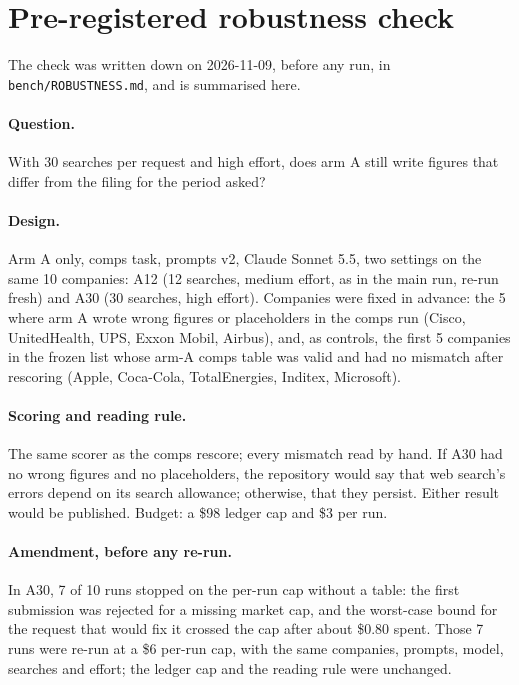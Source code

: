 \documentclass[10pt,a4paper]{article}
\begin{document}
\section{Pre-registered robustness check}
\label{app:prereg}

The check was written down on 2026-11-09, before any run, in \texttt{bench/ROBUSTNESS.md}, and is summarised here.

\paragraph{Question.} With 30 searches per request and high effort, does arm A still write figures that differ from
the filing for the period asked?

\paragraph{Design.} Arm A only, comps task, prompts v2, Claude Sonnet 5.5, two settings on the same 10 companies:
A12 (12 searches, medium effort, as in the main run, re-run fresh) and A30 (30 searches, high effort). Companies were
fixed in advance: the 5 where arm A wrote wrong figures or placeholders in the comps run (Cisco, UnitedHealth, UPS,
Exxon Mobil, Airbus), and, as controls, the first 5 companies in the frozen list whose arm-A comps table was valid and
had no mismatch after rescoring (Apple, Coca-Cola, TotalEnergies, Inditex, Microsoft).

\paragraph{Scoring and reading rule.} The same scorer as the comps rescore; every mismatch read by hand. If A30 had
no wrong figures and no placeholders, the repository would say that web search's errors depend on its search
allowance; otherwise, that they persist. Either result would be published. Budget: a \$98 ledger cap and \$3 per
run.

\paragraph{Amendment, before any re-run.} In A30, 7 of 10 runs stopped on the per-run cap without a table: the first
submission was rejected for a missing market cap, and the worst-case bound for the request that would fix it crossed
the cap after about \$0.80 spent. Those 7 runs were re-run at a \$6 per-run cap, with the same companies, prompts,
model, searches and effort; the ledger cap and the reading rule were unchanged.
\end{document}

